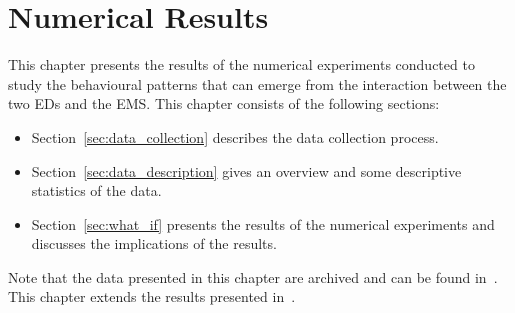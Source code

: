 \chapter{Numerical Results}\label{sec:numerical_results}

This chapter presents the results of the numerical experiments conducted to
study the behavioural patterns that can emerge from the interaction between the
two EDs and the EMS.
This chapter consists of the following sections:
\begin{itemize}
    \item Section~\ref{sec:data_collection} describes the data collection
    process.
    \item Section~\ref{sec:data_description} gives an overview and some
    descriptive statistics of the data.
    \item Section~\ref{sec:what_if} presents the results of the numerical
    experiments and discusses the implications of the results.
\end{itemize}

Note that the data presented in this chapter are archived and can be found
in~\cite{michalis_panayides_2023_7555285}.
This chapter extends the results presented in~\cite{panayides2023game}.






